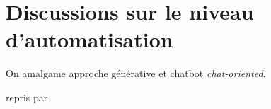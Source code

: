 	
	\section{Discussions sur le niveau d'automatisation}
	\label{annex:B.2-CHATBOT-DISCUSSION-AUTOMATISATION}
		
			
		\begin{leftBarAuthorOpinion}
			On amalgame approche générative et chatbot \textit{chat-oriented}.
		\end{leftBarAuthorOpinion}
		
		\cite{sheridan-verplank:1978:human-computer-control} repris par \cite{parasuraman-etal:2000:model-types-levels} \\ %

